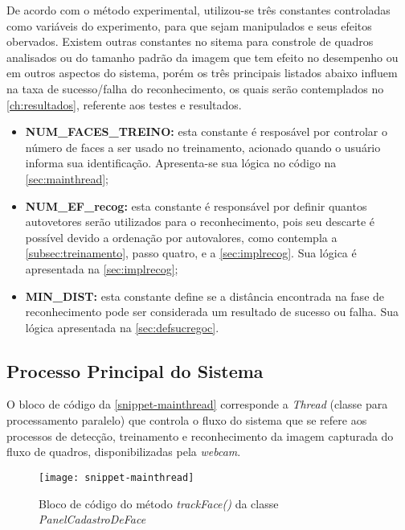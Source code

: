 De acordo com o método experimental, utilizou-se três constantes controladas como variáveis do experimento, para que sejam manipulados e seus efeitos obervados. Existem outras constantes no sitema para constrole de quadros analisados ou do tamanho padrão da imagem que tem efeito no desempenho ou em outros aspectos do sistema, porém os três principais listados abaixo influem na taxa de sucesso/falha do reconhecimento, os quais serão contemplados no \autoref{ch:resultados}, referente aos testes e resultados.

\begin{itemize}	
		\item \textbf{NUM\_FACES\_TREINO:} esta constante é resposável por controlar o número de faces a ser usado no treinamento, acionado quando o usuário informa sua identificação. Apresenta-se sua lógica no código na \autoref{sec:mainthread};
		
		\item \textbf{NUM\_EF\_recog:} esta constante é responsável por definir quantos autovetores serão utilizados para o reconhecimento, pois seu descarte é possível devido a ordenação por autovalores, como contempla a \autoref{subsec:treinamento}, passo quatro, e a \autoref{sec:implrecog}. Sua lógica é apresentada na \autoref{sec:implrecog};
		
		\item \textbf{MIN\_DIST:} esta constante define se a distância encontrada na fase de reconhecimento pode ser considerada um resultado de sucesso ou falha. Sua lógica apresentada na \autoref{sec:defsucregoc}.
\end{itemize}


\subsection{Processo Principal do Sistema}\label{sec:mainthread}

O bloco de código da \autoref{snippet-mainthread} corresponde a \textit{Thread} (classe para processamento paralelo) que controla o fluxo do sistema que se refere aos processos de detecção, treinamento e reconhecimento da imagem capturada do fluxo de quadros, disponibilizadas pela \textit{webcam}.

\begin{figure}[h]
	\centering
	\texttt{[image: snippet-mainthread]}
	\caption{Bloco de código do método \textit{trackFace()} da classe \textit{PanelCadastroDeFace}}
	\label{snippet-mainthread}
\end{figure}



